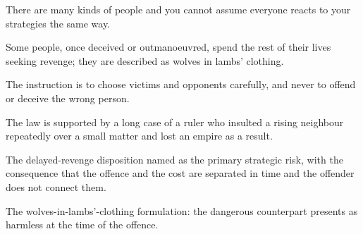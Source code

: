 

\begin{distilled}
  \item There are many kinds of people and you cannot assume everyone reacts to your strategies the same way.
  \item Some people, once deceived or outmanoeuvred, spend the rest of their lives seeking revenge; they are described as wolves in lambs' clothing.
  \item The instruction is to choose victims and opponents carefully, and never to offend or deceive the wrong person.
  \item The law is supported by a long case of a ruler who insulted a rising neighbour repeatedly over a small matter and lost an empire as a result.
\end{distilled}

\begin{unique}
  \item The delayed-revenge disposition named as the primary strategic risk, with the consequence that the offence and the cost are separated in time and the offender does not connect them.
  \item The wolves-in-lambs'-clothing formulation: the dangerous counterpart presents as harmless at the time of the offence.
\end{unique}
